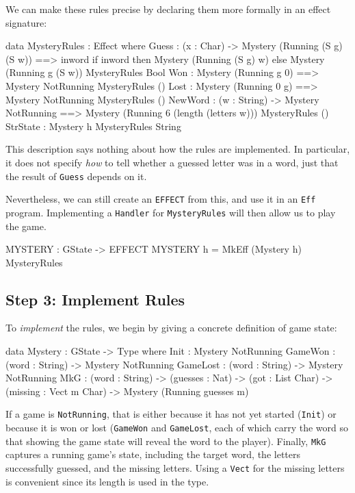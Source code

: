 \noindent
We can make these rules precise by declaring them more formally in an
effect signature:

\begin{code}
data MysteryRules : Effect where
     Guess : (x : Char) ->
             { Mystery (Running (S g) (S w)) ==>
               {inword} if inword then Mystery (Running (S g) w)
                                  else Mystery (Running g (S w)) }
                MysteryRules Bool
     Won  : { Mystery (Running g 0) ==> Mystery NotRunning } MysteryRules ()
     Lost : { Mystery (Running 0 g) ==> Mystery NotRunning } MysteryRules ()
     NewWord : (w : String) ->
               { Mystery NotRunning ==>
                 Mystery (Running 6 (length (letters w))) } MysteryRules ()
     StrState : { Mystery h } MysteryRules String
\end{code}

\noindent
This description says nothing about how the rules are implemented. In particular,
it does not specify \emph{how} to tell whether a guessed letter was in a word,
just that the result of \texttt{Guess} depends on it.

Nevertheless, we can still create an \texttt{EFFECT} from this, and use it
in an \texttt{Eff} program. Implementing a \texttt{Handler} for
\texttt{MysteryRules} will then allow us to play the game.

\begin{code}
MYSTERY : GState -> EFFECT
MYSTERY h = MkEff (Mystery h) MysteryRules
\end{code}

\subsection{Step 3: Implement Rules}

To \emph{implement} the rules, we begin by giving a concrete definition of
game state:

\begin{code}
data Mystery : GState -> Type where
     Init     : Mystery NotRunning 
     GameWon  : (word : String) -> Mystery NotRunning
     GameLost : (word : String) -> Mystery NotRunning
     MkG      : (word : String) ->
                (guesses : Nat) ->
                (got : List Char) ->
                (missing : Vect m Char) ->
                Mystery (Running guesses m)
\end{code}

\noindent
If a game is \texttt{NotRunning}, that is either because it
has not yet started (\texttt{Init}) or because it is won or lost (\texttt{GameWon}
and \texttt{GameLost}, each of which carry the word so that showing the game
state will reveal the word to the player). Finally, \texttt{MkG} captures a 
running game's state, including the target word, the letters successfully
guessed, and the missing letters. Using a \texttt{Vect} for the missing
letters is convenient since its length is used in the type.

